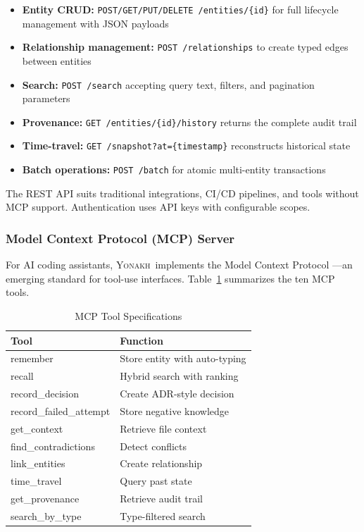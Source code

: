 \documentclass[10pt,journal,compsoc]{IEEEtran}
\newcommand{\yonakh}{\textsc{Yonakh}}
\begin{document}
\begin{itemize}
\item \textbf{Entity CRUD:} \texttt{POST/GET/PUT/DELETE /entities/\{id\}} for full lifecycle management with JSON payloads
\item \textbf{Relationship management:} \texttt{POST /relationships} to create typed edges between entities
\item \textbf{Search:} \texttt{POST /search} accepting query text, filters, and pagination parameters
\item \textbf{Provenance:} \texttt{GET /entities/\{id\}/history} returns the complete audit trail
\item \textbf{Time-travel:} \texttt{GET /snapshot?at=\{timestamp\}} reconstructs historical state
\item \textbf{Batch operations:} \texttt{POST /batch} for atomic multi-entity transactions
\end{itemize}

The REST API suits traditional integrations, CI/CD pipelines, and tools without MCP support. Authentication uses API keys with configurable scopes.

\subsubsection{Model Context Protocol (MCP) Server}

For AI coding assistants, \yonakh\ implements the Model Context Protocol \cite{mcp2024}---an emerging standard for tool-use interfaces. Table~\ref{tab:mcp} summarizes the ten MCP tools.

\begin{table}[t]
\caption{MCP Tool Specifications}
\label{tab:mcp}
\centering
\small
\renewcommand{\arraystretch}{1.3}
\begin{tabular}{@{}p{} p{}@{}}
\toprule
\textbf{Tool} & \textbf{Function} \\
\midrule
remember & Store entity with auto-typing \\
recall & Hybrid search with ranking \\
record\_decision & Create ADR-style decision \\
record\_failed\_attempt & Store negative knowledge \\
get\_context & Retrieve file context \\
find\_contradictions & Detect conflicts \\
link\_entities & Create relationship \\
time\_travel & Query past state \\
get\_provenance & Retrieve audit trail \\
search\_by\_type & Type-filtered search \\
\bottomrule
\end{tabular}
\end{table}
\end{document}
